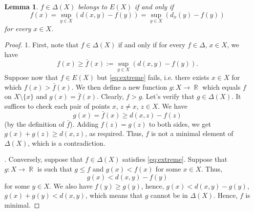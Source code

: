 \documentclass[12pt]{amsbook}%
\newtheorem{lem}[thm]{Lemma}
\theoremstyle{definition}
\theoremstyle{remark}
\numberwithin{section}{chapter}
\numberwithin{subsection}{section}
\numberwithin{figure}{chapter}
\DeclareMathOperator{\R}{\mathbb{R}}
\begin{document}
\begin{lem}\label{lem:extreme}
$f\in \Delta(X)$ belongs to $E(X)$ if and only if 
\begin{equation}\label{eq:extreme}
f(x)=\sup_{y\in X} (d(x,y) -f(y))= \sup_{y\in X} (d_x(y) -f(y))
\end{equation}
for every $x\in X$. 
\end{lem} 
\begin{proof} 1. First, note that $f\in \Delta(X)$ if and only if 
for every $f\in \Delta$, $x\in X$, we have
$$
f(x)\geqslant \bar{f}(x):=\sup_{y\in X} (d(x,y) -f(y)). 
$$
 Suppose now that $f\in E(X)$ but  \eqref{eq:extreme} fails, i.e. there exists $x\in X$ for which $f(x)> \bar{f}(x)$. We then define a new function $g: X\to \R$ which equals 
 $f$ on $X\setminus \{x\}$ and $g(x)=\bar{f}(x)$. Clearly, $f> g$. Let's verify that $g\in \Delta(X)$. It suffices to  check each pair of points $x$, $z\ne x$, $z\in X$. We have
 $$
g(x)= \bar{f}(x)\geqslant d(x,z)- f(z)
 $$
(by the definition of $\bar{f}$). Adding $f(z)=g(z)$ to both sides, we get $g(x)+g(z)\geqslant d(x,z)$, as required. Thus, $f$ is not a minimal element of $\Delta(X)$, which is a contradiction. 

. Conversely, suppose that $f\in \Delta(X)$ satisfies  \eqref{eq:extreme}. Suppose that $g: X\to \R$ is such that $g\leqslant f$ and $g(x)< f(x)$ for some $x\in X$. Thus,
$$
g(x)< d(x,y) -f(y)
$$ 
for some $y\in X$. We also have $f(y)\geqslant g(y)$, hence, $g(x)< d(x,y) - g(y)$, $g(x)+ g(y)< d(x,y)$, which means that $g$ cannot be in $\Delta(X)$. Hence, $f$ is minimal.   
\end{proof}
\end{document}
